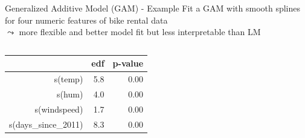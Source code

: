 \documentclass[11pt,compress,t,notes=noshow, aspectratio=169, xcolor=table]{beamer}
\begin{document}
\begin{frame}{Generalized Additive Model (GAM) - Example}
Fit a GAM with smooth splines for four numeric features of bike rental data \\
$\leadsto$ more flexible and better model fit but less interpretable than LM

\begin{columns}[T, totalwidth=\textwidth]
\begin{column}{0.45\textwidth}
\begin{table}[ht]
\centering
\scriptsize
\begin{tabular}{rrr}
  \hline
 & edf & p-value \\ 
  \hline
s(temp) & 5.8 & 0.00 \\ 
  s(hum) & 4.0 & 0.00 \\ 
  s(windspeed) & 1.7 & 0.00 \\ 
  s(days\_since\_2011) & 8.3 & 0.00 \\ 
   \hline
\end{tabular}
\end{table}



\end{column}
\end{columns}
\end{frame}
\end{document}
